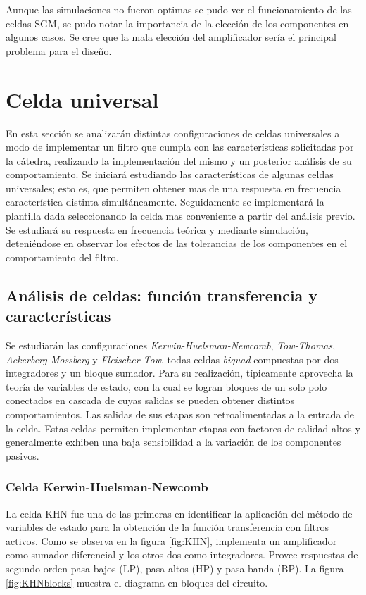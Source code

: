 Aunque las simulaciones no fueron optimas se pudo ver el funcionamiento de las celdas SGM, se pudo notar la importancia de la elección de los componentes en algunos casos. Se cree que la mala elección del amplificador sería el principal problema para el diseño.


\section{Celda universal}

En esta sección se analizarán distintas configuraciones de celdas universales a modo de implementar un filtro que cumpla con las características solicitadas por la cátedra, realizando la implementación del mismo y un posterior análisis de su comportamiento. Se iniciará estudiando las características de algunas celdas universales; esto es, que permiten obtener mas de una respuesta en frecuencia característica distinta simultáneamente. Seguidamente se implementará la plantilla dada seleccionando la celda mas conveniente a partir del análisis previo. Se estudiará su respuesta en frecuencia teórica y mediante simulación, deteniéndose en observar los efectos de las tolerancias de los componentes en el comportamiento del filtro. 

\subsection{Análisis de celdas: función transferencia y características}

Se estudiarán las configuraciones \emph{Kerwin-Huelsman-Newcomb}, \emph{Tow-Thomas}, \emph{Ackerberg-Mossberg} y \emph{Fleischer-Tow}, todas celdas \emph{biquad} compuestas por dos integradores y un bloque sumador. Para su realización, típicamente aprovecha la teoría de variables de estado, con la cual se logran bloques de un solo polo conectados en cascada de cuyas salidas se pueden obtener distintos comportamientos. Las salidas de sus etapas son retroalimentadas a la entrada de la celda. 
Estas celdas permiten implementar etapas con factores de calidad altos y generalmente exhiben una baja sensibilidad a la variación de los componentes pasivos. 




\subsubsection{Celda Kerwin-Huelsman-Newcomb}

La celda KHN fue una de las primeras en identificar la aplicación del método de variables de estado para la obtención de la función transferencia con filtros activos. Como se observa en la figura \ref{fig:KHN}, implementa un amplificador como sumador diferencial y los otros dos como integradores. Provee respuestas de segundo orden pasa bajos (LP), pasa altos (HP) y pasa banda (BP). La figura \ref{fig:KHNblocks} muestra el diagrama en bloques del circuito.

